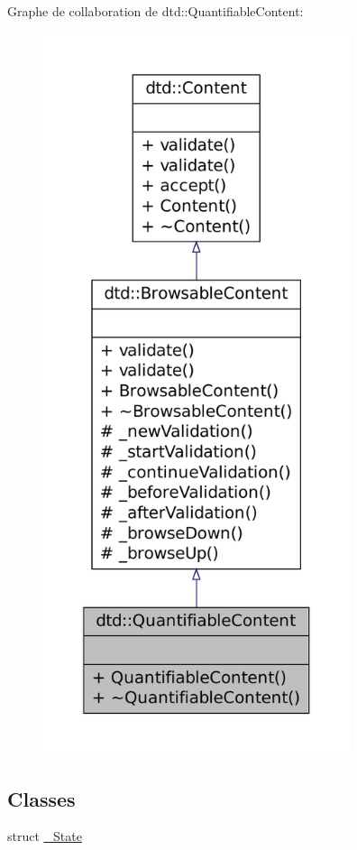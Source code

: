 Graphe de collaboration de dtd::QuantifiableContent:\nopagebreak
\begin{figure}[H]
\begin{center}
\leavevmode
\includegraphics[height=600pt]{classdtd_1_1_quantifiable_content__coll__graph}
\end{center}
\end{figure}
\subsection*{Classes}
\begin{DoxyCompactItemize}
\item 
struct \hyperlink{structdtd_1_1_quantifiable_content_1_1___state}{\_\-State}
\end{DoxyCompactItemize}
